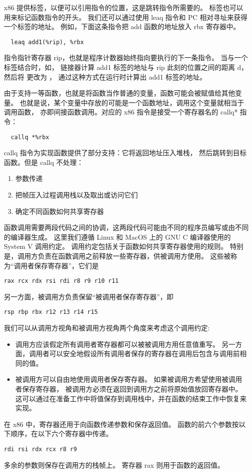 x86 提供标签，以便可以引用指令的位置，这是跳转指令所需要的。
标签也可以用来标记函数指令的开头。
我们还可以通过使用 leaq 指令和 PC 相对寻址来获得一个标签的地址。
例如，下面这条指令把 add 函数的地址放入 rbx 寄存器中。
\begin{lstlisting}
  leaq add1(%rip), %rbx
\end{lstlisting}

指令指针寄存器 rip，也就是程序计数器始终指向要执行的下一条指令。
当与一个标签结合时，如，
链接器计算 add1 标签的地址与 rip 此刻的位置之间的距离 d，
然后将  更改为 ，
通过这种方式在运行时计算出 add1 标签的地址。

由于支持一等函数，也就是将函数当作普通的变量，函数可能会被赋值给其他变量。
也就是说，某个变量中存放的可能是一个函数地址，调用这个变量就相当于调用函数，
亦即间接函数调用。对应的 x86 指令是接受一个寄存器名的 callq* 指令：
\begin{lstlisting}
  callq *%rbx
\end{lstlisting}

callq 指令为实现函数提供了部分支持：它将返回地址压入堆栈，
然后跳转到目标函数。但是 callq 不处理：
\begin{enumerate}
\item 参数传递
\item 把帧压入过程调用栈以及取出或访问它们
\item 确定不同函数如何共享寄存器
\end{enumerate}

函数调用需要两段代码之间的协调，这两段代码可能由不同的程序员编写或由不同的编译器生成。
这里我们遵循 Linux 和 MacOS 上的 GNU C 编译器使用的
System V 调用约定\cite{Matz_Hubicka_Jaeger_Mitchell_2013}。
调用约定包括关于函数如何共享寄存器使用的规则。
特别是，调用方负责在函数调用之前释放一些寄存器，供被调用方使用。
这些被称为“调用者保存寄存器”，它们是
\begin{lstlisting}
rax rcx rdx rsi rdi r8 r9 r10 r11
\end{lstlisting}
另一方面，被调用方负责保留“被调用者保存寄存器”，即
\begin{lstlisting}
rsp rbp rbx r12 r13 r14 r15
\end{lstlisting}

我们可以从调用方视角和被调用方视角两个角度来考虑这个调用约定:
\begin{itemize}
\item 调用方应该假定所有调用者寄存器都可以被被调用方用任意值重写。
另一方面，调用者可以安全地假设所有调用者保存的寄存器在调用后包含与调用前相同的值。
\item 被调用方可以自由地使用调用者保存寄存器。
如果被调用方希望使用被调用者保存寄存器，
被调用方必须在返回到调用方之前将原始值放回寄存器中。
这可以通过在准备工作中将值保存到调用栈中，并在函数的结束工作中恢复来实现。
\end{itemize}

在 x86 中，寄存器还用于向函数传递参数和保存返回值。
函数的前六个参数按以下顺序，在以下六个寄存器中传递。

\begin{lstlisting}
rdi rsi rdx rcx r8 r9
\end{lstlisting}

多余的参数则保存在调用方的栈帧上。
寄存器 rax 则用于函数的返回值。

